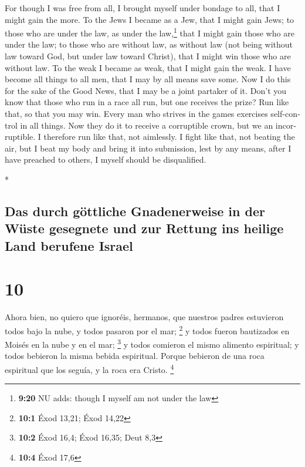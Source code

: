 \begin{paracol}{2}
\begin{otherlanguage}{english}
 For though I was free from all, I brought myself under
bondage to all, that I might gain the more.  To the Jews
I became as a Jew, that I might gain Jews; to those who are under the
law, as under the law,\footnote{\textbf{9:20} NU adds: though I myself
  am not under the law} that I might gain those who are under the law;
 to those who are without law, as without law (not being
without law toward God, but under law toward Christ), that I might win
those who are without law.  To the weak I became as weak,
that I might gain the weak. I have become all things to all men, that I
may by all means save some.  Now I do this for the sake
of the Good News, that I may be a joint partaker of it. 
Don't you know that those who run in a race all run, but one receives
the prize? Run like that, so that you may win.  Every man
who strives in the games exercises self-control in all things. Now they
do it to receive a corruptible crown, but we an incorruptible.
 I therefore run like that, not aimlessly. I fight like
that, not beating the air,  but I beat my body and bring
it into submission, lest by any means, after I have preached to others,
I myself should be disqualified.

\end{otherlanguage}

\switchcolumn[0]*

\hypertarget{das-durch-guxf6ttliche-gnadenerweise-in-der-wuxfcste-gesegnete-und-zur-rettung-ins-heilige-land-berufene-israel}{%
\subsection{Das durch göttliche Gnadenerweise in der Wüste gesegnete und
zur Rettung ins heilige Land berufene
Israel}\label{das-durch-guxf6ttliche-gnadenerweise-in-der-wuxfcste-gesegnete-und-zur-rettung-ins-heilige-land-berufene-israel}}

\hypertarget{section-18}{%
\section{10}\label{section-18}}

 Ahora bien, no quiero que ignoréis, hermanos, que
nuestros padres estuvieron todos bajo la nube, y todos pasaron por el
mar; \footnote{\textbf{10:1} Éxod 13,21; Éxod 14,22}  y
todos fueron bautizados en Moisés en la nube y en el mar; \footnote{\textbf{10:2}
  Éxod 16,4; Éxod 16,35; Deut 8,3}  y todos comieron el
mismo alimento espiritual;  y todos bebieron la misma
bebida espiritual. Porque bebieron de una roca espiritual que los
seguía, y la roca era Cristo. \footnote{\textbf{10:4} Éxod 17,6}


\end{paracol}
